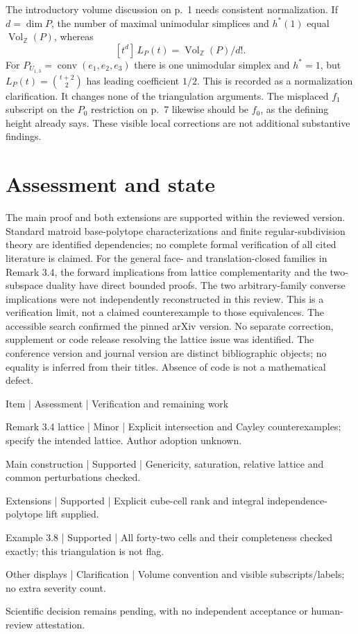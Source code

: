 \documentclass[10pt]{article}
\begin{document}
The introductory volume discussion on p. 1 needs consistent normalization. If \(d=\dim P\), the number of maximal unimodular simplices and \(h^*(1)\) equal \(\operatorname{Vol}_{\mathbb Z}(P)\), whereas \[[t^d]\,L_P(t)=\operatorname{Vol}_{\mathbb Z}(P)/d!.\] For \(P_{U_{1,3}}=\operatorname{conv}(e_1,e_2,e_3)\) there is one unimodular simplex and \(h^*=1\), but \(L_P(t)=\binom{t+2}{2}\) has leading coefficient \(1/2\). This is recorded as a normalization clarification. It changes none of the triangulation arguments. The misplaced \(f_1\) subscript on the \(P_0\) restriction on p. 7 likewise should be \(f_0\), as the defining height already says. These visible local corrections are not additional substantive findings.\par
\section*{Assessment and state}
The main proof and both extensions are supported within the reviewed version. Standard matroid base-polytope characterizations and finite regular-subdivision theory are identified dependencies; no complete formal verification of all cited literature is claimed. For the general face- and translation-closed families in Remark 3.4, the forward implications from lattice complementarity and the two-subspace duality have direct bounded proofs. The two arbitrary-family converse implications were not independently reconstructed in this review. This is a verification limit, not a claimed counterexample to those equivalences. The accessible search confirmed the pinned arXiv version. No separate correction, supplement or code release resolving the lattice issue was identified. The conference version and journal version are distinct bibliographic objects; no equality is inferred from their titles. Absence of code is not a mathematical defect.\par
Item | Assessment | Verification and remaining work\par
Remark 3.4 lattice | Minor | Explicit intersection and Cayley counterexamples; specify the intended lattice. Author adoption unknown.\par
Main construction | Supported | Genericity, saturation, relative lattice and common perturbations checked.\par
Extensions | Supported | Explicit cube-cell rank and integral independence-polytope lift supplied.\par
Example 3.8 | Supported | All forty-two cells and their completeness checked exactly; this triangulation is not flag.\par
Other displays | Clarification | Volume convention and visible subscripts/labels; no extra severity count.\par
Scientific decision remains pending, with no independent acceptance or human-review attestation.\par
\end{document}
